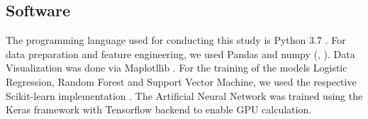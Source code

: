 \subsection{Software}
The programming language used for conducting this study is Python 3.7 \cite{python2020}.
For data preparation and feature engineering, we used Pandas and numpy (\cite{pandas2020}, \cite{numpy2020}).
Data Visualization was done via Maplotllib \cite{matplotlib2020}.
For the training of the models Logistic Regression, Random Forest and Support Vector Machine,
we used the respective Scikit-learn implementation \cite{scikit2020}. 
The Artificial Neural Network was trained using the Keras framework with Tensorflow backend to enable
GPU calculation.